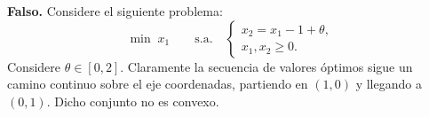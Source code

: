 \textbf{Falso.} Considere el siguiente problema:
\[
  \min\; x_1 \qquad \text{s.a.} \quad
  \begin{cases}
    x_2=x_1 - 1 + \theta, \\ 
    x_1, x_2 \geq 0.
  \end{cases}
\]
Considere $\theta \in [0,2]$. Claramente la secuencia de valores óptimos sigue un camino continuo sobre el eje coordenadas, partiendo  en $(1,0)$ y llegando a $(0,1)$. Dicho conjunto no es convexo.


